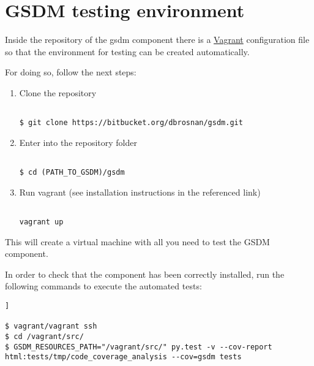 \chapter{GSDM testing environment}\label{c:install_gsdm}

Inside the repository of the \acrshort{gsdm} component there is a \href{https://www.vagrantup.com/}{Vagrant} configuration file so that the environment for testing can be created automatically.

For doing so, follow the next steps:

\begin{enumerate}

\item Clone the repository

\begin{lstlisting}[breaklines=true, style=bash]

$ git clone https://bitbucket.org/dbrosnan/gsdm.git

\end{lstlisting}

\item Enter into the repository folder

\begin{lstlisting}[breaklines=true, style=bash]

$ cd (PATH_TO_GSDM)/gsdm

\end{lstlisting}

\item Run vagrant (see installation instructions in the referenced link)

\begin{lstlisting}[breaklines=true, style=bash]

vagrant up

\end{lstlisting}

\end{enumerate}

This will create a virtual machine with all you need to test the GSDM component.

In order to check that the component has been correctly installed, run the following commands to execute the automated tests:

\begin{lstlisting}[breaklines=true, style=bash]]

$ vagrant/vagrant ssh
$ cd /vagrant/src/
$ GSDM_RESOURCES_PATH="/vagrant/src/" py.test -v --cov-report html:tests/tmp/code_coverage_analysis --cov=gsdm tests

\end{lstlisting}

